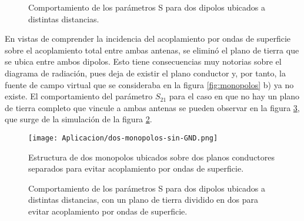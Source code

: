 \begin{figure}[h]
	\centering 
	\hspace{0pt}
	\caption{Comportamiento de los parámetros S para dos dipolos ubicados a distintas distancias.}
	\label{fig:dipolos-distancia-resultados}	
\end{figure}  

En vistas de comprender la incidencia del acoplamiento por ondas de superficie sobre el acoplamiento total entre ambas antenas, se eliminó el plano de tierra que se ubica entre ambos dipolos. Esto tiene consecuencias muy notorias sobre el diagrama de radiación, pues deja de existir el plano conductor y, por tanto, la fuente de campo virtual que se consideraba en la figura \ref{fig:monopolos} b) ya no existe. El comportamiento del parámetro $S_{21}$ para el caso en que no hay un plano de tierra completo que vincule a ambas antenas se pueden observar en la figura \ref{fig:monopolos-sin-plano-de-tierra-resultados}, que surge de la simulación de la figura \ref{fig:monopolos-sin-plano-de-tierra-geometria}. 


\begin{figure}[h]
	\centering
	\texttt{[image: Aplicacion/dos-monopolos-sin-GND.png]}
	\caption{Estructura de dos monopolos ubicados sobre dos planos conductores separados para evitar acoplamiento por ondas de superficie.}
	\label{fig:monopolos-sin-plano-de-tierra-geometria}
\end{figure}

\begin{figure}[h]
	\centering 
	\hspace{0pt}
	\caption{Comportamiento de los parámetros S para dos dipolos ubicados a distintas distancias, con un plano de tierra dividido en dos para evitar acoplamiento por ondas de superficie.}
	\label{fig:monopolos-sin-plano-de-tierra-resultados}	
\end{figure}  

